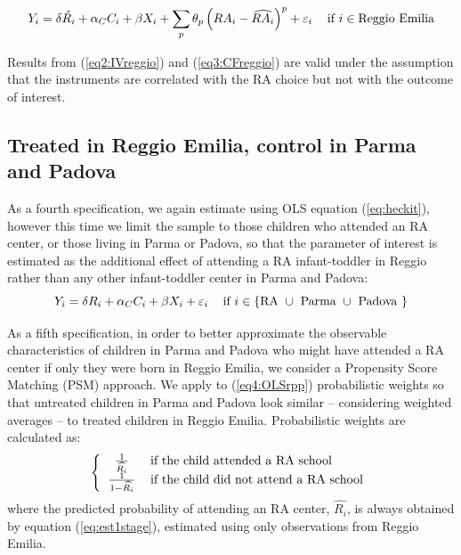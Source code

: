 \documentclass[12pt]{article}
\begin{document}
\begin{equation}
Y_{i} = \delta \hat{R_{i}} + \alpha_{C} C_{i} + \beta X_{i} + \sum_p \theta_{p} \left(RA_{i} - \widehat{RA_{i}} \right)^{p} + \varepsilon_{i} \hspace{2ex} \text{ if } i \in \text{Reggio Emilia} \label{eq3:CFreggio}
\end{equation}

Results from (\ref{eq2:IVreggio}) and (\ref{eq3:CFreggio}) are valid under the assumption that the instruments are correlated with the RA choice but not with the outcome of interest.

\subsection{Treated in Reggio Emilia, control in Parma and Padova}

As a fourth specification, we again estimate using OLS equation (\ref{eq:heckit}), however this time we limit the sample to those children who attended an RA center, or those living in Parma or Padova, so that the parameter of interest is estimated as the additional effect of attending a RA infant-toddler in Reggio rather than any other infant-toddler center in Parma and Padova:
%
\begin{equation}
Y_{i} = \delta R_{i} + \alpha_{C} C_{i} + \beta X_{i} + \varepsilon_{i}    \hspace{2ex} \text{ if } i \in \{\text{RA } \cup \text{ Parma } \cup \text{ Padova } \} \label{eq4:OLSrpp}
\end{equation} 

\medskip

As a fifth specification, in order to better approximate the observable characteristics of children in Parma and Padova who might have attended a RA center if only they were born in Reggio Emilia, we consider a Propensity Score Matching (PSM) approach. 
We apply to (\ref{eq4:OLSrpp}) probabilistic weights so that untreated children in Parma and Padova look similar -- considering weighted averages -- to treated children in Reggio Emilia. 
Probabilistic weights are calculated as:%
\begin{equation}
\left\{
\begin{tabular}{cl}
$\frac{1}{\widehat{R_{i}}}$   & if the child attended a RA school \\
$\frac{1}{1-\widehat{R_{i}}}$ & if the child did not attend a RA school
\end{tabular}
\right. \label{eq:weights}
\end{equation}
%
where the predicted probability of attending an RA center, $\widehat{R_{i}}$, is always obtained by equation (\ref{eq:est1stage}), estimated using only observations from Reggio Emilia.
\end{document}
